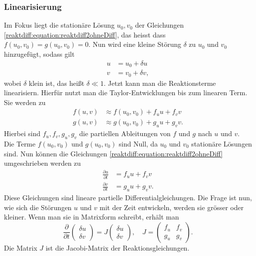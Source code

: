 \subsubsection{Linearisierung}
Im Fokus liegt die stationäre Lösung \(u_0, v_0\) der Gleichungen \eqref{reaktdiff:equation:reaktdiff2ohneDiff}, das heisst dass \(f(u_0,v_0) = g(u_0,v_0) = 0\).
Nun wird eine kleine Störung $\delta$ zu $u_0$ und $v_0$ hinzugefügt, sodass gilt
\begin{align*}
    u &= u_0 + \delta u\\
    v &= v_0 + \delta v,
\end{align*}
wobei $\delta$ klein ist, das heißt $\delta \ll 1$.
Jetzt kann man die Reaktionsterme linearisiern.
Hierfür nutzt man die Taylor-Entwicklungen bis zum linearen Term.
Sie werden zu
\begin{align*}
    f(u,v) &\approx f(u_0,v_0) + f_u  u + f_v v\\
    g(u,v) &\approx g(u_0,v_0) + g_u  u + g_v v.
\end{align*}
Hierbei sind \(f_u, f_v, g_u, g_v\) die partiellen Ableitungen von \(f\) und \(g\) nach \(u\) und \(v\).
Die Terme \(f(u_0,v_0)\) und \(g(u_0,v_0)\) sind Null, da \(u_0\) und \(v_0\) stationäre Lösungen sind.
Nun können die Gleichungen \eqref{reaktdiff:equation:reaktdiff2ohneDiff} umgeschrieben werden zu
\begin{align}
    \label{reaktdiff:equation:reaktdiff2ohneDifflinearisiert1}
    \frac{\partial u}{\partial t} &= f_u u + f_v v\\
    \label{reaktdiff:equation:reaktdiff2ohneDifflinearisiert2}
    \frac{\partial v}{\partial t} &= g_u u + g_v  v.
\end{align}
Diese Gleichungen sind lineare partielle Differentialgleichungen.
Die Frage ist nun, wie sich die Störungen \(u\) und \(v\) mit der Zeit entwickeln, werden sie grösser oder kleiner.
Wenn man sie in Matrixform schreibt, erhält man
\begin{equation*}
    \label{reaktdiff:equation:reaktdiff2ohneDiffmatrix}
    \frac{\partial}{\partial t} \begin{pmatrix}
        \delta u\\
        \delta v
    \end{pmatrix} = 
    J 
    \begin{pmatrix}
        \delta u\\
        \delta v
    \end{pmatrix}
    , \quad
    J =
    \begin{pmatrix}
        f_u & f_v\\
        g_u & g_v
    \end{pmatrix}.
\end{equation*}
Die Matrix \(J\) ist die Jacobi-Matrix der Reaktionsgleichungen.
%

